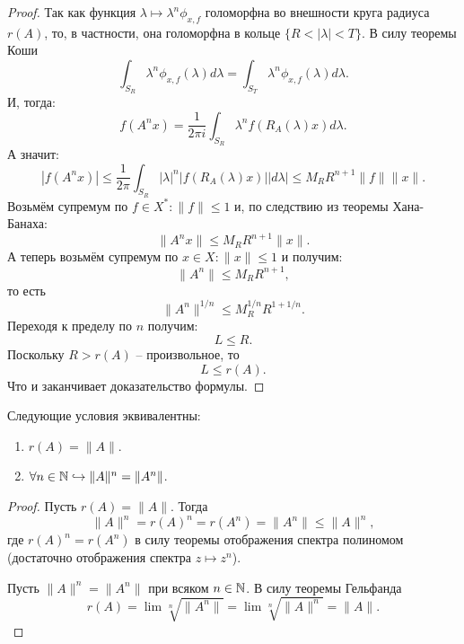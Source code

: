 \begin{proof}
    Так как функция $\lambda \mapsto \lambda^n \phi_{x, f}$ голоморфна во внешности круга радиуса $r(A)$, то, в частности, она голоморфна в кольце $\{R < |\lambda| < T\}$. В силу теоремы Коши
    \[
        \int_{S_R} \lambda^n \phi_{x, f}(\lambda)d\lambda = \int_{S_T} \lambda^n  \phi_{x, f}(\lambda)d\lambda.
    \]
    И, тогда:
    \[
        f(A^n x) = \frac{1}{2\pi i} \int_{S_R} \lambda^n f(R_A(\lambda)x)d\lambda.
    \]
    А значит:
    \[
        |f(A^n x)| \leq \frac{1}{2\pi} \int_{S_R} |\lambda|^n |f(R_A(\lambda)x)||d\lambda| \leq M_R R^{n + 1}\|f\|\|x\|.
    \]
    Возьмём супремум по $f \in X^*\colon \|f\| \leq 1$ и, по следствию из теоремы Хана-Банаха:
    \[
        \|A^n x\| \leq M_R R^{n + 1}\|x\|.
    \]
    А теперь возьмём супремум по $x \in X\colon \|x\| \leq 1$ и получим:
    \[
        \|A^n\| \leq M_R R^{n + 1},
    \]
    то есть
    \[
        \|A^n\|^{1/n} \leq M_R^{1/n}R^{1 + 1/n}.
    \]
    Переходя к пределу по $n$ получим:
    \[
        L \leq R.
    \]
    Поскольку $R > r(A)$ -- произвольное, то 
    \[
        L \leq r(A).
    \]
    Что и заканчивает доказательство формулы.
\end{proof}

\begin{theorem}
    Следующие условия эквивалентны:
    \begin{enumerate}
        \item $r(A) = \|A\|$.
        \item $\forall n \in \mathbb{N} \hookrightarrow \|A\|^n = \|A^n\|$.
    \end{enumerate}
\end{theorem}
\begin{proof}
    Пусть $r(A) = \|A\|$.
    Тогда
    \[
        \|A\|^n = r(A)^n = r(A^n) = \|A^n\| \leq \|A\|^n,
    \]
    где $r(A)^n = r(A^n)$ в силу теоремы отображения спектра полиномом (достаточно отображения спектра $z \mapsto z^n$).

    Пусть $\|A\|^n = \|A^n\|$ при всяком $n \in \mathbb{N}$.
    В силу теоремы Гельфанда
    \[
        r(A) = \lim \sqrt[n]{\|A^n\|} = \lim \sqrt[n]{\|A\|^n} = \|A\|.
    \]
\end{proof}
